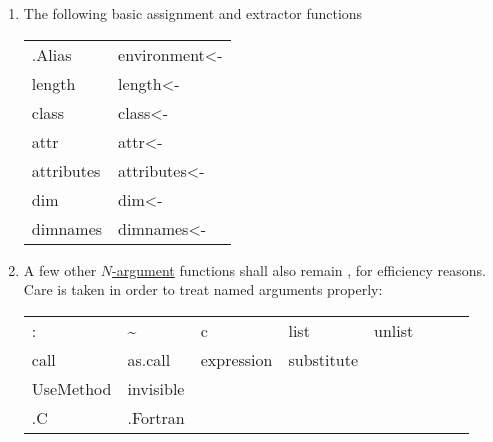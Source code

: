\begin{enumerate}
\item The following basic assignment and extractor functions
  \begin{center}\ttfamily
    \begin{tabular}{ll}
      .Alias & environment<- \\
      length & length<- \\
      class  & class<-  \\
        attr & attr<- \\
   attributes& attributes<- \\
      dim    & dim<- \\
    dimnames & dimnames<- \\
    \end{tabular}
  \end{center}

\item A few other \underline{$N$-argument} functions shall also remain
  \primfun, for efficiency reasons.
  Care is taken in order to treat named arguments properly:
  \begin{center}\ttfamily
    \begin{tabular}{*{8}{l}}
      :    & \~ & c & list & unlist \\
      call & as.call & expression & substitute \\
      UseMethod & invisible \\
      .C & .Fortran
    \end{tabular}
  \end{center}

\end{enumerate}


